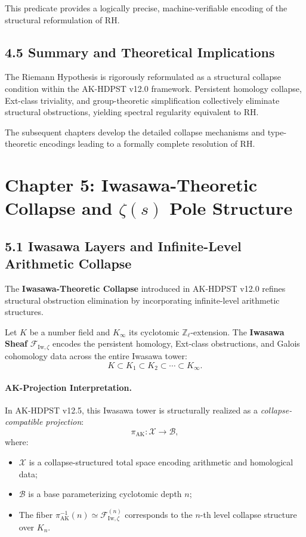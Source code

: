 \documentclass[11pt]{article}
\begin{document}
This predicate provides a logically precise, machine-verifiable encoding of the structural reformulation of RH.

\subsection*{4.5 Summary and Theoretical Implications}

The Riemann Hypothesis is rigorously reformulated as a structural collapse condition within the AK-HDPST v12.0 framework. Persistent homology collapse, Ext-class triviality, and group-theoretic simplification collectively eliminate structural obstructions, yielding spectral regularity equivalent to RH.

The subsequent chapters develop the detailed collapse mechanisms and type-theoretic encodings leading to a formally complete resolution of RH.



\section{Chapter 5: Iwasawa-Theoretic Collapse and $\zeta(s)$ Pole Structure}

\subsection*{5.1 Iwasawa Layers and Infinite-Level Arithmetic Collapse}

The \textbf{Iwasawa-Theoretic Collapse} introduced in AK-HDPST v12.0 refines structural obstruction elimination by incorporating infinite-level arithmetic structures.

Let $K$ be a number field and $K_\infty$ its cyclotomic $\mathbb{Z}_\ell$-extension. The \textbf{Iwasawa Sheaf} $\mathcal{F}_{\mathrm{Iw}, \zeta}$ encodes the persistent homology, Ext-class obstructions, and Galois cohomology data across the entire Iwasawa tower:
\[
K \subset K_1 \subset K_2 \subset \cdots \subset K_\infty.
\]

\paragraph{AK-Projection Interpretation.}
In AK-HDPST v12.5, this Iwasawa tower is structurally realized as a \textit{collapse-compatible projection}:
\[
\pi_{\mathrm{AK}} : \mathcal{X} \longrightarrow \mathcal{B},
\]
where:
\begin{itemize}
    \item $\mathcal{X}$ is a collapse-structured total space encoding arithmetic and homological data;
    \item $\mathcal{B}$ is a base parameterizing cyclotomic depth $n$;
    \item The fiber $\pi_{\mathrm{AK}}^{-1}(n) \simeq \mathcal{F}_{\mathrm{Iw}, \zeta}^{(n)}$ corresponds to the $n$-th level collapse structure over $K_n$.
\end{itemize}
\end{document}
